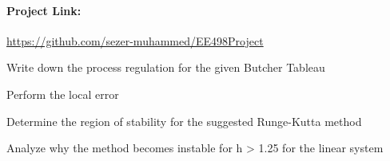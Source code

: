 \documentclass[11pt]{article}
\begin{document}

\maketitle %

\thispagestyle{empty} %

\newpage

\paragraph*{Project Link:} \url{https://github.com/sezer-muhammed/EE498Project}

\begin{question}


	\begin{subquestion}{Write down the process regulation for the given Butcher Tableau}

	\end{subquestion}
	\answer{


	}

	\begin{subquestion}{Perform the local error}

	\end{subquestion}
	\answer{


	}

	\begin{subquestion}{Determine the region of stability for the suggested Runge-Kutta method}

	\end{subquestion}
	\answer{


	}

	\begin{subquestion}{Analyze why the method becomes instable for h > 1.25 for the linear system}

	\end{subquestion}
	\answer{


	}

\end{question}
\end{document}
